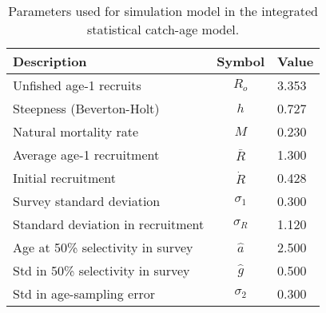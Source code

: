 \begin{table}[!tbh]
	\caption{Parameters used for simulation model in the integrated statistical catch-age model.}
	\label{table:simulationpars}
	\begin{center}
		\begin{tabular}{l|cl}
		\hline

		\hline
		\textbf{Description} & \textbf{Symbol} & \textbf{Value} \\
		\hline	
			 Unfished age-1 recruits 			& $R_o$ 	 & 3.353 \\
			 Steepness (Beverton-Holt) 			& $h$ 		 & 0.727 \\
			 Natural mortality rate 			& $M$		 & 0.230 \\
			 Average age-1 recruitment			& $\bar{R}$	 & 1.300 \\
			 Initial recruitment 				& $\dot{R}$  & 0.428 \\
			 Survey standard deviation 	   		& $\sigma_1$ & 0.300 \\
			 Standard deviation in recruitment	& $\sigma_R$ & 1.120 \\
			 Age at 50\% selectivity in survey  & $\hat{a}$  & 2.500 \\
			 Std in 50\% selectivity in survey  & $\hat{g}$  & 0.500 \\
			 Std in age-sampling error          & $\sigma_2$ & 0.300\\
		\hline

		\hline
		\end{tabular}
	\end{center}
\end{table}



